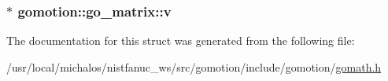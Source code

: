 \hypertarget{structgomotion_1_1go__matrix_a46242c485b2f46d23f6b4997cb382392}{
\subsubsection[{v}]{$\ast$ gomotion\-::go\-\_\-matrix\-::v}}\label{structgomotion_1_1go__matrix_a46242c485b2f46d23f6b4997cb382392}


The documentation for this struct was generated from the following file\-:\begin{DoxyCompactItemize}
\item 
/usr/local/michalos/nistfanuc\-\_\-ws/src/gomotion/include/gomotion/\hyperlink{gomath_8h}{gomath.\-h}\end{DoxyCompactItemize}
